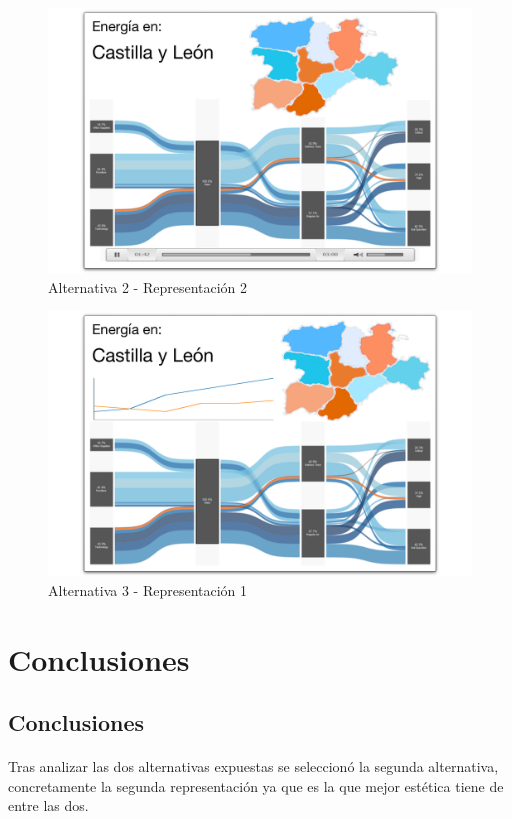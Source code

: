\documentclass{article}
\begin{document}
			\begin{figure}[H]
				\centering
				\includegraphics[width=130mm]{../res/design4.png}
				\caption{Alternativa 2 - Representación 2 \label{sketch22}}
			\end{figure}

			\begin{figure}[H]
				\centering
				\includegraphics[width=130mm]{../res/design5.png}
				\caption{Alternativa 3  - Representación 1\label{sketch3}}
			\end{figure}
			
	\section{Conclusiones}

		\subsection{Conclusiones}
			
			\paragraph{}
			Tras analizar las dos alternativas expuestas se seleccionó la segunda alternativa, concretamente la segunda representación ya que es la que mejor estética tiene de entre las dos.
			
\end{document}
